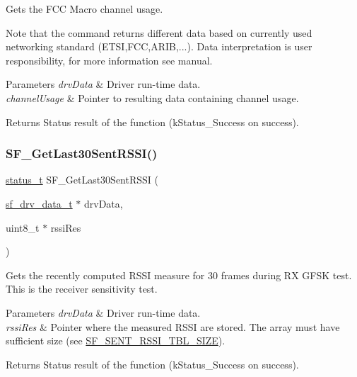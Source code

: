 Gets the F\+CC Macro channel usage. 

Note that the command returns different data based on currently used networking standard (E\+T\+SI,F\+CC,A\+R\+IB,...). Data interpretation is user responsibility, for more information see manual.


\begin{DoxyParams}{Parameters}
{\em drv\+Data} & Driver run-\/time data. \\
\hline
{\em channel\+Usage} & Pointer to resulting data containing channel usage.\\
\hline
\end{DoxyParams}
\begin{DoxyReturn}{Returns}
Status result of the function (k\+Status\+\_\+\+Success on success). 
\end{DoxyReturn}
\mbox{\label{group__sf__functions__group_ga3f0b30bc3200751a313d6a8366048d44}} 
\subsubsection{\texorpdfstring{SF\_GetLast30SentRSSI()}{SF\_GetLast30SentRSSI()}}
{\footnotesize\ttfamily \mbox{\hyperlink{group__ksdk__common_gaaabdaf7ee58ca7269bd4bf24efcde092}{status\+\_\+t}} S\+F\+\_\+\+Get\+Last30\+Sent\+R\+S\+SI (\begin{DoxyParamCaption}\item[{\mbox{\hyperlink{structsf__drv__data__t}{sf\+\_\+drv\+\_\+data\+\_\+t}} $\ast$}]{drv\+Data,  }\item[{uint8\+\_\+t $\ast$}]{rssi\+Res }\end{DoxyParamCaption})}



Gets the recently computed R\+S\+SI measure for 30 frames during RX G\+F\+SK test. This is the receiver sensitivity test. 


\begin{DoxyParams}{Parameters}
{\em drv\+Data} & Driver run-\/time data. \\
\hline
{\em rssi\+Res} & Pointer where the measured R\+S\+SI are stored. The array must have sufficient size (see \mbox{\hyperlink{sf__ol23xx_8h_a54662d5dbbfed0f5e033947d58038c88}{S\+F\+\_\+\+S\+E\+N\+T\+\_\+\+R\+S\+S\+I\+\_\+\+T\+B\+L\+\_\+\+S\+I\+ZE}}).\\
\hline
\end{DoxyParams}
\begin{DoxyReturn}{Returns}
Status result of the function (k\+Status\+\_\+\+Success on success). 
\end{DoxyReturn}
\mbox{\label{group__sf__functions__group_ga07eaf722b934e94542d6fd74b6a981d4}} 
